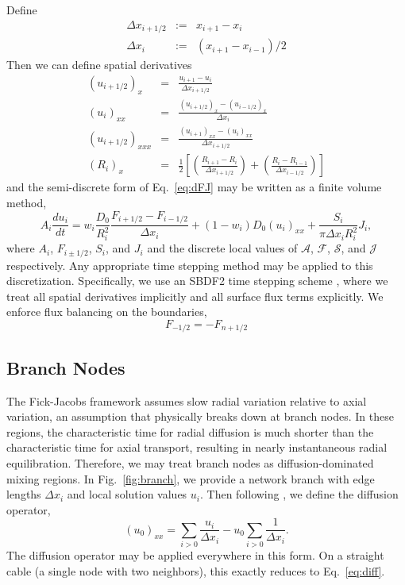 \documentclass[11pt]{article}
\begin{document}
Define
\begin{eqnarray}
    \Delta x_{i+1/2} &:=& x_{i+1} - x_{i} \\
    \Delta x_i &:= &(x_{i+1} - x_{i-1})/2
\end{eqnarray}
Then we can define spatial derivatives
\begin{eqnarray}
    (u_{i+1/2})_x &=& \frac{u_{i+1} - u_{i}}{\Delta x_{i+1/2}} \\
    (u_i)_{xx} &=& \frac{(u_{i+1/2})_x - (u_{i-1/2})_x}{\Delta x_i} \label{eq:diff} \\
    (u_{i+1/2})_{xxx} &=& \frac{(u_{i+1})_{xx} - (u_{i})_{xx}}{\Delta x_{i+1/2}} \\
    (R_i)_x &=& \frac{1}{2} \left[ \left( \frac{R_{i+1} - R_{i}}{\Delta x_{i+1/2}} \right) + \left( \frac{R_{i} - R_{i-1}}{\Delta x_{i-1/2}} \right) \right]
\end{eqnarray}
and the semi-discrete form of Eq.~\eqref{eq:dFJ} may be written as a finite volume method,
\begin{equation}
    A_i \frac{du_i}{dt} = w_i \frac{D_0}{R_i^2} \frac{F_{i+1/2} - F_{i-1/2}}{\Delta x_i} + (1 - w_i) D_0 (u_i)_{xx} + \frac{S_i}{\pi \Delta x_i R_i^2} J_i,
\end{equation}
where $A_i$, $F_{i\pm1/2}$, $S_i$, and $J_i$ and the discrete local values of $\mathcal{A}$, $\mathcal{F}$, $\mathcal{S}$, and $\mathcal{J}$ respectively. Any appropriate time stepping method may be applied to this discretization. Specifically, we use an SBDF2 time stepping scheme \cite{BRNQ2023}, where we treat all spatial derivatives implicitly and all surface flux terms explicitly. We enforce flux balancing on the boundaries,
\begin{equation}
    F_{-1/2} = -F_{n+1/2}
\end{equation}


\subsection{Branch Nodes}

The Fick-Jacobs framework assumes slow radial variation relative to axial variation, an assumption that physically breaks down at branch nodes. In these regions, the characteristic time for radial diffusion is much shorter than the characteristic time for axial transport, resulting in nearly instantaneous radial equilibration. Therefore, we may treat branch nodes as diffusion-dominated mixing regions. In Fig.~\ref{fig:branch}, we provide a network branch with edge lengths $\Delta x_i$ and local solution values $u_i$. Then following \cite{BRNQ2023}, we define the diffusion operator,
\begin{equation}
    (u_0)_{xx} = \sum_{i > 0} \frac{u_i}{\Delta x_i} - u_0 \sum_{i > 0} \frac{1}{\Delta x_i}.
\end{equation}
The diffusion operator may be applied everywhere in this form. On a straight cable (a single node with two neighbors), this exactly reduces to Eq.~\eqref{eq:diff}.
\end{document}
